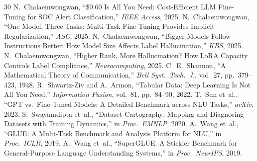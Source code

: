 \documentclass[review,3p]{elsarticle}
\begin{document}
\begin{thebibliography}{30}
 N.~Chalaemwongwan, ``\$0.60 Is All You Need: Cost-Efficient LLM Fine-Tuning for SOC Alert Classification,'' \emph{IEEE Access}, 2025.
 N.~Chalaemwongwan, ``One Model, Three Tasks: Multi-Task Fine-Tuning Provides Implicit Regularization,'' \emph{ASC}, 2025.
 N.~Chalaemwongwan, ``Bigger Models Follow Instructions Better: How Model Size Affects Label Hallucination,'' \emph{KBS}, 2025.
 N.~Chalaemwongwan, ``Higher Rank, More Hallucination? How LoRA Capacity Controls Label Compliance,'' \emph{Neurocomputing}, 2025.
 C.~E.~Shannon, ``A Mathematical Theory of Communication,'' \emph{Bell Syst.\ Tech.\ J.}, vol.~27, pp.~379--423, 1948.
 R.~Shwartz-Ziv and A.~Armon, ``Tabular Data: Deep Learning Is Not All You Need,'' \emph{Information Fusion}, vol.~81, pp.~84--90, 2022.
 T.~Sun et~al., ``GPT vs.\ Fine-Tuned Models: A Detailed Benchmark across NLU Tasks,'' \emph{arXiv}, 2023.
 S.~Swayamdipta et~al., ``Dataset Cartography: Mapping and Diagnosing Datasets with Training Dynamics,'' in \emph{Proc.\ EMNLP}, 2020.
 A.~Wang et~al., ``GLUE: A Multi-Task Benchmark and Analysis Platform for NLU,'' in \emph{Proc.\ ICLR}, 2019.
 A.~Wang et~al., ``SuperGLUE: A Stickier Benchmark for General-Purpose Language Understanding Systems,'' in \emph{Proc.\ NeurIPS}, 2019.
\end{thebibliography}
\end{document}

